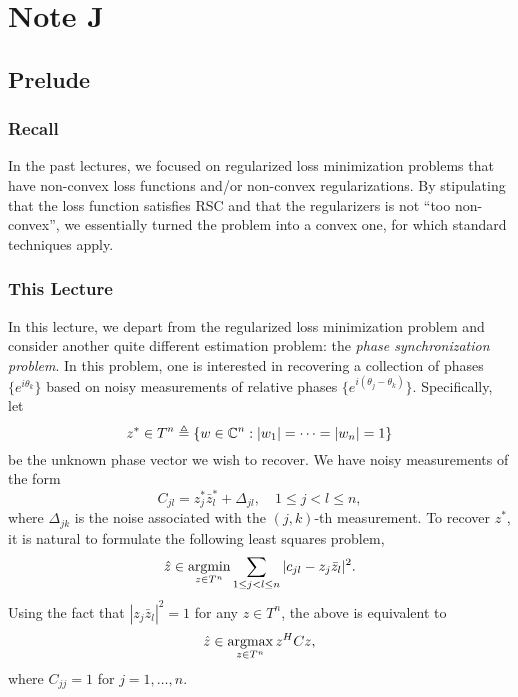 \clearpage
\section{Note J}

\subsection{Prelude}

\subsubsection{Recall}

In the past lectures,
we focused on regularized loss minimization problems that have
non-convex loss functions and/or non-convex regularizations.
By stipulating that the loss function satisfies RSC and that
the regularizers is not ``too non-convex'',
we essentially turned the problem into a convex one,
for which standard techniques apply.

\subsubsection{This Lecture}

In this lecture,
we depart from the regularized loss minimization problem and
consider another quite different estimation problem:
the \emph{phase synchronization problem}.
In this problem,
one is interested in recovering a collection of phases $\{e^{i\theta_k}\}$
based on noisy measurements of relative phases $\{e^{i(\theta_j-\theta_k)}\}$.
Specifically,
let
\begin{equation}
    z^*\in T^n\triangleq\{w\in{\mathbb{C}}^n:|w_1|=\cdots=|w_n|=1\}
\end{equation}
be the unknown phase vector we wish to recover.
We have noisy measurements of the form
\begin{equation}\label{eq:probj}
    C_{jl}=z_j^*\bar z_l^*+\Delta_{jl},\quad 1\le j<l\le n,
\end{equation}
where $\Delta_{jk}$ is the noise associated with the $(j,k)$-th measurement.
To recover $z^*$,
it is natural to formulate the following least squares problem,
\begin{equation}
    \hat z \in\mathop{\mathrm{argmin}}_{z\in T^n}\sum_{1\le j<l\le n}|c_{jl}-z_j\bar z_l|^2.
\end{equation}
Using the fact that $|z_j\bar z_l|^2=1$ for any $z\in T^n$,
the above is equivalent to
\begin{equation}\label{eq:j_p}
    \hat z \in\mathop{\mathrm{argmax}}_{z\in T^n}z^HCz,
\end{equation}
where $C_{jj}=1$ for $j=1,\dots,n$.

